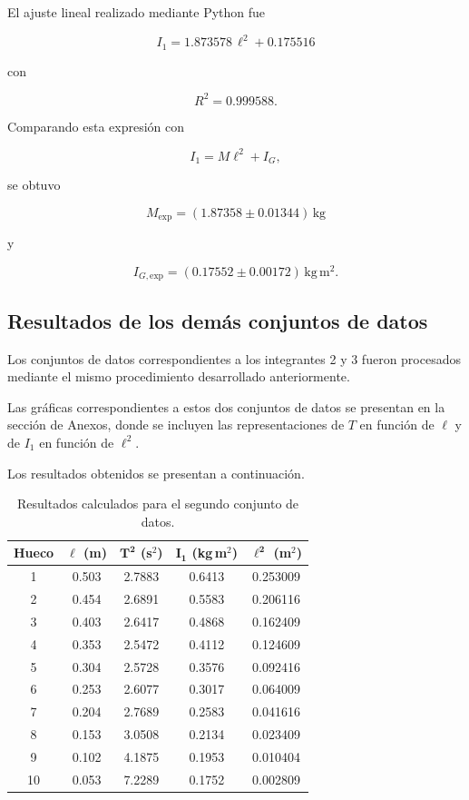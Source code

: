 \documentclass[11pt,a4paper]{article}
\begin{document}
El ajuste lineal realizado mediante Python fue

\[
\boxed{
I_1=1.873578\,\ell^2+0.175516
}
\]

con

\[
\boxed{
R^2=0.999588
}.
\]

Comparando esta expresión con

\[
I_1=M\ell^2+I_G,
\]

se obtuvo

\[
\boxed{
M_{\mathrm{exp}}
=
(1.87358\pm0.01344)\,\mathrm{kg}
}
\]

y

\[
\boxed{
I_{G,\mathrm{exp}}
=
(0.17552\pm0.00172)\,\mathrm{kg\,m^2}
}.
\]

\subsection{Resultados de los demás conjuntos de datos}

Los conjuntos de datos correspondientes a los integrantes 2 y 3 fueron
procesados mediante el mismo procedimiento desarrollado anteriormente.

Las gráficas correspondientes a estos dos conjuntos de datos se presentan en la sección de Anexos, donde se incluyen las representaciones de $T$ en función de $\ell$ y de $I_1$ en función de $\ell^2$.

Los resultados obtenidos se presentan a continuación.

\begin{table}[H]
    \centering
    \small
    \renewcommand{\arraystretch}{1.05}
    \setlength{\tabcolsep}{7pt}

    \begin{tabular}{ccccc}
        \toprule
        \textbf{Hueco} &
        $\boldsymbol{\ell}$ \textbf{(m)} &
        $\boldsymbol{T^2}$ \textbf{(s$^2$)} &
        $\boldsymbol{I_1}$ \textbf{(kg\,m$^2$)} &
        $\boldsymbol{\ell^2}$ \textbf{(m$^2$)} \\
        \midrule
        1  & 0.503 & 2.7883 & 0.6413 & 0.253009 \\
        2  & 0.454 & 2.6891 & 0.5583 & 0.206116 \\
        3  & 0.403 & 2.6417 & 0.4868 & 0.162409 \\
        4  & 0.353 & 2.5472 & 0.4112 & 0.124609 \\
        5  & 0.304 & 2.5728 & 0.3576 & 0.092416 \\
        6  & 0.253 & 2.6077 & 0.3017 & 0.064009 \\
        7  & 0.204 & 2.7689 & 0.2583 & 0.041616 \\
        8  & 0.153 & 3.0508 & 0.2134 & 0.023409 \\
        9  & 0.102 & 4.1875 & 0.1953 & 0.010404 \\
        10 & 0.053 & 7.2289 & 0.1752 & 0.002809 \\
        \bottomrule
    \end{tabular}

    \caption{Resultados calculados para el segundo conjunto de datos.}
    \label{tab:resultados_integrante2}
\end{table}
\end{document}
